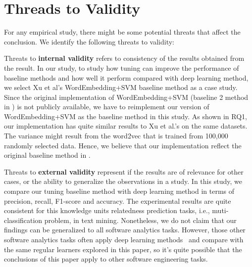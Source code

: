 \section{Threads to Validity}
For any empirical study, there might be some potential threats that
affect the conclusion. We identify the following threats to validity:

Threats to \textbf{internal validity} refers to consistency of the results 
obtained from the result. In our study,  to study how
tuning can improve the performance of baseline methods and how well
it perform compared with deep learning method, we select
Xu et al's  WordEmbedding+SVM baseline method as a case study. Since the original implementation of 
WordEmbedding+SVM (baseline 2 method in \cite{xu2016predicting}) is not 
publicly available, we have to reimplement our version of WordEmbedding+SVM as
the baseline method in this study. As shown in RQ1, our implementation has
quite similar results to Xu et al.'s on the same datasets. The variance might 
result from the word2vec that is trained from 100,000 randomly selected data.
Hence, we believe that our implementation reflect the original
 baseline method in \cite{xu2016predicting}.
 
 Threats to \textbf{external validity} represent if the results are of relevance for
 other cases, or the ability to generalize the observations in a study. In this study,
 we compare our tuning baseline method with deep learning method in terms of
 precision, recall, F1-score and accuracy. The experimental results are quite consistent
 for this knowledge units relatedness prediction tasks, i.e.,  muti-classification problem, in text mining. 
 Nonetheless, we do not claim that our findings can be generalized to all software analytics tasks. 
 However, those other software analytics tasks often apply deep learning
 methods~\cite{choetkiertikul2016deep, wang2016automatically} and compare with
 the same regular learners explored in this paper, so it's quite possible that
  the conclusions of this paper apply to other software engineering tasks.
 
 


